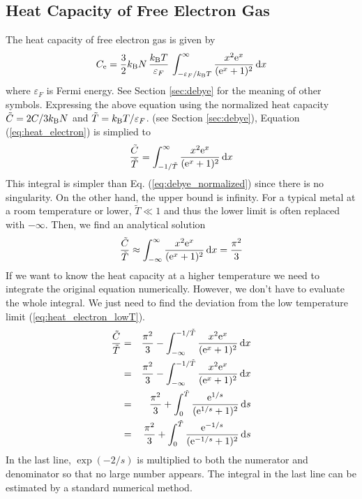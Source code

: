 \subsection{Heat Capacity of Free Electron Gas}
\label{sec:heat_electron}
The heat capacity of free electron gas is given by 
%
\begin{equation}\label{eq:heat_electron}
C_\text{e} = \frac{3}{2} k_\text{B} N \,  \frac{k_\text{B} T}{\varepsilon_F} \,\int_{-\varepsilon_F/k_\text{B} T}^{\infty} \frac{x^2 \text{e}^x}{(\text{e}^x+1)^2} \dd{x}
\end{equation}
%
where $\varepsilon_F$ is Fermi energy.\cite{heat_electron} See Section \ref{sec:debye} for the meaning of other symbols.
Expressing the above equation using the normalized heat capacity $\tilde{C}=2C/3 k_\text{B} N$ and $\tilde{T}=k_\text{B} T/\varepsilon_F$. (see Section \ref{sec:debye}), Equation (\ref{eq:heat_electron})  is simplied to
%
\begin{equation}
\frac{\tilde{C}}{\tilde{T}} = \int_{-1/\tilde{T}}^\infty \frac{x^2 \text{e}^x}{(\text{e}^x+1)^2} \dd{x}
\end{equation}
%
This integral is simpler than Eq. (\ref{eq:debye_normalized}) since there is no singularity. On the other hand, the upper bound is infinity.
For a typical metal at a room temperature or lower, $\tilde{T} \ll 1$ and thus the lower limit is often replaced with $-\infty$.  Then, we find an analytical solution
%
\begin{equation}
\frac{\tilde{C}}{\tilde{T}} \approx \int_{-\infty}^{\infty} \frac{x^2 \text{e}^x}{(\text{e}^x+1)^2} \dd{x} = \frac{\pi^2}{3}
\label{eq:heat_electron_lowT}
\end{equation}
%
If we want to know the heat capacity at a higher temperature we need to integrate the original equation numerically.  However, we don't have to evaluate the whole integral.  We just need to find the deviation from the low temperature limit (\ref{eq:heat_electron_lowT}).
%
\begin{eqnarray}
\frac{\tilde{C}}{\tilde{T}} &=& \frac{\pi^2}{3} - \int_{-\infty}^{-1/\tilde{T}} \frac{x^2 \text{e}^x}{(\text{e}^x+1)^2} \dd{x} \nonumber\\
&=& \frac{\pi^2}{3} - \int_{-\infty}^{-1/\tilde{T}} \frac{x^2 \text{e}^x}{(\text{e}^x+1)^2} \dd{x} \nonumber\\
&=& \frac{\pi^2}{3} + \int_{0}^{\tilde{T}} \frac{\text{e}^{1/s}}{(\text{e}^{1/s}+1)^2} \dd{s} \nonumber\\
&=& \frac{\pi^2}{3} + \int_{0}^{\tilde{T}} \frac{\text{e}^{-1/s}}{(\text{e}^{-1/s}+1)^2} \dd{s}\label{eq:delta_heat_electron}
\end{eqnarray}
In the last line, $\exp(-2/s)$ is multiplied to both the numerator and denominator so that no large number appears.  The integral in the last line can be estimated by a standard numerical method.

